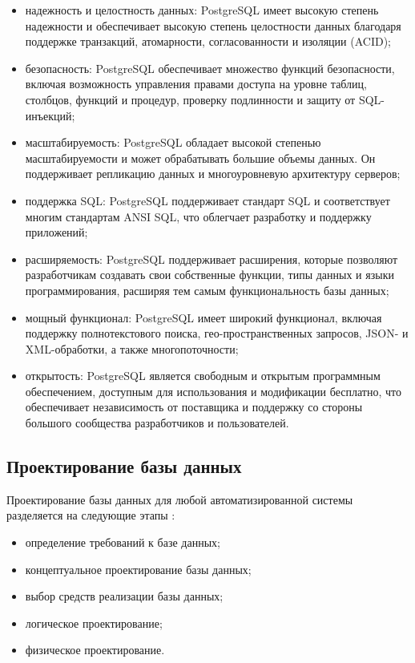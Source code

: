 \begin{itemize}
    \item надежность и целостность данных: PostgreSQL имеет высокую степень надежности и обеспечивает высокую степень целостности данных благодаря поддержке транзакций, атомарности, согласованности и изоляции (ACID);
    \item безопасность: PostgreSQL обеспечивает множество функций безопасности, включая возможность управления правами доступа на уровне таблиц, столбцов, функций и процедур, проверку подлинности и защиту от SQL-инъекций;
    \item масштабируемость: PostgreSQL обладает высокой степенью масштабируемости и может обрабатывать большие объемы данных. Он поддерживает репликацию данных и многоуровневую архитектуру серверов;
    \item поддержка SQL: PostgreSQL поддерживает стандарт SQL и соответствует многим стандартам ANSI SQL, что облегчает разработку и поддержку приложений;
    \item расширяемость: PostgreSQL поддерживает расширения, которые позволяют разработчикам создавать свои собственные функции, типы данных и языки программирования, расширяя тем самым функциональность базы данных;
    \item мощный функционал: PostgreSQL имеет широкий функционал, включая поддержку полнотекстового поиска, гео-пространственных запросов, JSON- и XML-обработки, а также многопоточности;
    \item открытость: PostgreSQL является свободным и открытым программным обеспечением, доступным для использования и модификации бесплатно, что обеспечивает независимость от поставщика и поддержку со стороны большого сообщества разработчиков и пользователей.
\end{itemize}



\subsection{Проектирование базы данных}

Проектирование базы данных для любой автоматизированной системы разделяется на следующие этапы \cite{book5}:

\begin{itemize}
    \item определение требований к базе данных;
    \item концептуальное проектирование базы данных;
    \item выбор средств реализации базы данных;
    \item логическое проектирование;
    \item физическое проектирование.
\end{itemize}

